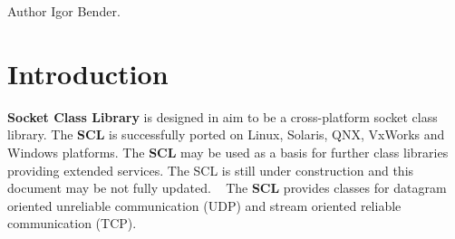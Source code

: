 \begin{DoxyAuthor}{Author}
Igor Bender.
\end{DoxyAuthor}
\hypertarget{index_intro_sec}{}\section{Introduction}\label{index_intro_sec}
{\bfseries Socket Class Library} is designed in aim to be a cross-\/platform socket class library. The {\bfseries S\+CL} is successfully ported on Linux, Solaris, Q\+NX, Vx\+Works and Windows platforms. The {\bfseries S\+CL} may be used as a basis for further class libraries providing extended services. The S\+CL is still under construction and this document may be not fully updated. ~\newline
 The {\bfseries S\+CL} provides classes for datagram oriented unreliable communication (U\+DP) and stream oriented reliable communication (T\+CP). 